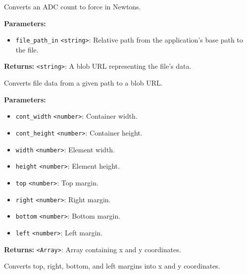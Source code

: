 \documentclass[12pt,a4paper]{article}
\begin{document}
\noindent Converts an ADC count to force in Newtons.

\vspace{5mm}
\noindent {}


\noindent \textbf{Parameters:}
\begin{itemize}
  \item \texttt{file\_path\_in} \texttt{<string>}: Relative path from the application's base path to the file.
\end{itemize}

\noindent \textbf{Returns:} \texttt{<string>}: A blob URL representing the file's data.

\noindent Converts file data from a given path to a blob URL.

\vspace{5mm}
\noindent {}


\noindent \textbf{Parameters:}
\begin{itemize}
  \item \texttt{cont\_width} \texttt{<number>}: Container width.
  \item \texttt{cont\_height} \texttt{<number>}: Container height.
  \item \texttt{width} \texttt{<number>}: Element width.
  \item \texttt{height} \texttt{<number>}: Element height.
  \item \texttt{top} \texttt{<number>}: Top margin.
  \item \texttt{right} \texttt{<number>}: Right margin.
  \item \texttt{bottom} \texttt{<number>}: Bottom margin.
  \item \texttt{left} \texttt{<number>}: Left margin.
\end{itemize}

\noindent \textbf{Returns:} \texttt{<Array>}: Array containing x and y coordinates.

\noindent Converts top, right, bottom, and left margins into x and y coordinates.

\vspace{5mm}
\noindent {}
\end{document}

